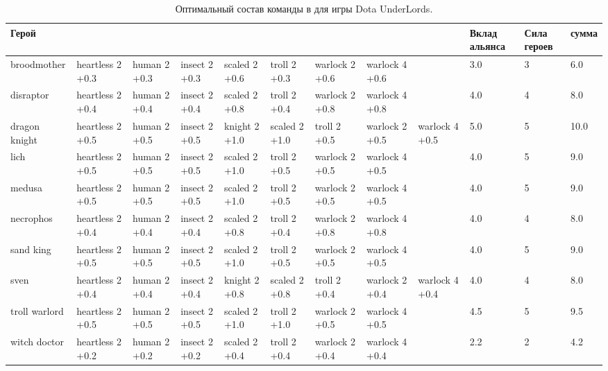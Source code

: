 \documentclass{article}
\begin{document}
\begin{table}
\resizebox{16cm}{!} {
\begin{tabular}{l| *{8}{p{1.6cm}} | *{3}{ p{1cm}} }
{Герой} &                   &               &                &                &                &                  &                  &                  &  Вклад альянса &  Сила героев &   сумма \\
\midrule
broodmother   &  heartless 2 +0.3  &  human 2 +0.3  &  insect 2 +0.3  &  scaled 2 +0.6  &   troll 2 +0.3  &  warlock  2 +0.6  &  warlock  4 +0.6  &                   &                  3.0 &           3 &   6.0 \\
disraptor     &  heartless 2 +0.4  &  human 2 +0.4  &  insect 2 +0.4  &  scaled 2 +0.8  &   troll 2 +0.4  &  warlock  2 +0.8  &  warlock  4 +0.8  &                   &                  4.0 &           4 &   8.0 \\
dragon knight &  heartless 2 +0.5  &  human 2 +0.5  &  insect 2 +0.5  &  knight 2 +1.0  &  scaled 2 +1.0  &     troll 2 +0.5  &  warlock  2 +0.5  &  warlock  4 +0.5  &                  5.0 &           5 &  10.0 \\
lich          &  heartless 2 +0.5  &  human 2 +0.5  &  insect 2 +0.5  &  scaled 2 +1.0  &   troll 2 +0.5  &  warlock  2 +0.5  &  warlock  4 +0.5  &                   &                  4.0 &           5 &   9.0 \\
medusa        &  heartless 2 +0.5  &  human 2 +0.5  &  insect 2 +0.5  &  scaled 2 +1.0  &   troll 2 +0.5  &  warlock  2 +0.5  &  warlock  4 +0.5  &                   &                  4.0 &           5 &   9.0 \\
necrophos     &  heartless 2 +0.4  &  human 2 +0.4  &  insect 2 +0.4  &  scaled 2 +0.8  &   troll 2 +0.4  &  warlock  2 +0.8  &  warlock  4 +0.8  &                   &                  4.0 &           4 &   8.0 \\
sand king     &  heartless 2 +0.5  &  human 2 +0.5  &  insect 2 +0.5  &  scaled 2 +1.0  &   troll 2 +0.5  &  warlock  2 +0.5  &  warlock  4 +0.5  &                   &                  4.0 &           5 &   9.0 \\
sven          &  heartless 2 +0.4  &  human 2 +0.4  &  insect 2 +0.4  &  knight 2 +0.8  &  scaled 2 +0.8  &     troll 2 +0.4  &  warlock  2 +0.4  &  warlock  4 +0.4  &                  4.0 &           4 &   8.0 \\
troll warlord &  heartless 2 +0.5  &  human 2 +0.5  &  insect 2 +0.5  &  scaled 2 +1.0  &   troll 2 +1.0  &  warlock  2 +0.5  &  warlock  4 +0.5  &                   &                  4.5 &           5 &   9.5 \\
witch doctor  &  heartless 2 +0.2  &  human 2 +0.2  &  insect 2 +0.2  &  scaled 2 +0.4  &   troll 2 +0.4  &  warlock  2 +0.4  &  warlock  4 +0.4  &                   &                  2.2 &           2 &   4.2 \\
\bottomrule
\end{tabular}
}
\caption{Оптимальный состав команды в для игры Dota UnderLords. }
\label{table:solution}
\end{table}
\end{document}
